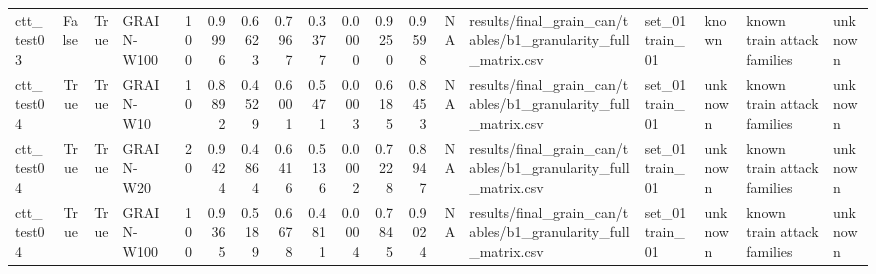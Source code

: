 \begin{tabular}{lrrlrrrrrrrrrlllll}
ctt\_test03 & False & True & GRAIN-W100 & 100 & 0.9996 & 0.6623 & 0.7967 & 0.3377 & 0.0000 & 0.9250 & 0.9598 & NA & results/final\_grain\_can/tables/b1\_granularity\_full\_matrix.csv & set\_01 train\_01 & known & known train attack families & unknown \\
ctt\_test04 & True & True & GRAIN-W10 & 10 & 0.8892 & 0.4529 & 0.6001 & 0.5471 & 0.0003 & 0.6185 & 0.8453 & NA & results/final\_grain\_can/tables/b1\_granularity\_full\_matrix.csv & set\_01 train\_01 & unknown & known train attack families & unknown \\
ctt\_test04 & True & True & GRAIN-W20 & 20 & 0.9424 & 0.4864 & 0.6416 & 0.5136 & 0.0002 & 0.7228 & 0.8947 & NA & results/final\_grain\_can/tables/b1\_granularity\_full\_matrix.csv & set\_01 train\_01 & unknown & known train attack families & unknown \\
ctt\_test04 & True & True & GRAIN-W100 & 100 & 0.9365 & 0.5189 & 0.6678 & 0.4811 & 0.0004 & 0.7845 & 0.9024 & NA & results/final\_grain\_can/tables/b1\_granularity\_full\_matrix.csv & set\_01 train\_01 & unknown & known train attack families & unknown \\
\bottomrule
\end{tabular}
